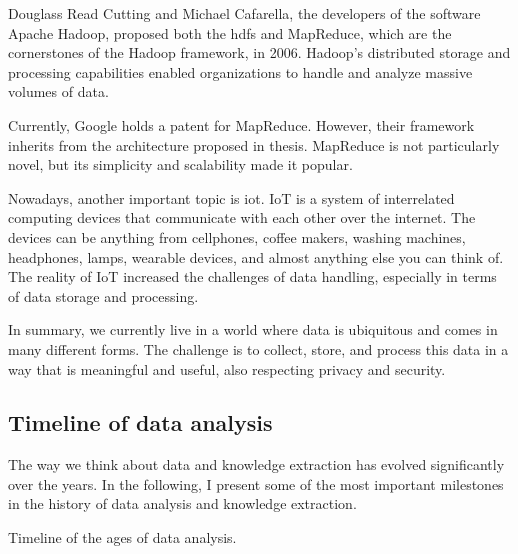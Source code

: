 Douglass Read Cutting and Michael Cafarella, the developers of the software Apache Hadoop,
proposed both the \gls{hdfs} and MapReduce, which are the
cornerstones of the Hadoop framework, in 2006.  Hadoop's distributed storage and
processing capabilities enabled organizations to handle and analyze massive volumes of
data.

Currently, Google holds a patent for
MapReduce.
However, their framework inherits from the architecture proposed in
\textcite{Hillis1985} thesis.
MapReduce is not particularly novel, but its simplicity and scalability made it popular.

Nowadays, another important topic is \gls{iot}.  IoT is a system of
interrelated computing devices that communicate with each other over the internet.
The devices can be anything from cellphones, coffee makers, washing machines, headphones,
lamps, wearable devices, and almost anything else you can think of.  The reality of IoT increased the
challenges of data handling, especially in terms of data storage and processing.

In summary, we currently live in a world where data is ubiquitous and comes in many
different forms.  The challenge is to collect, store, and process this data in a way that
is meaningful and useful, also respecting privacy and security.

\subsection{Timeline of data analysis}
\label{sub:time-analysis}

The way we think about data and knowledge extraction has evolved significantly over the
years.  In the following, I present some of the most important milestones in the history
of data analysis and knowledge extraction.

\begin{figurebox}[label=fig:data-analysis-history]{Timeline of the ages of data analysis.}
  \centering
\end{figurebox}

